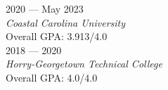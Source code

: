 
	\hfill 2020 --- May 2023 \\
\textit{Coastal Carolina University} \\ 
Overall GPA: 3.913/4.0 \\
   \hfill	2018 --- 2020 \\ 
\textit{Horry-Georgetown Technical College} \\ 
Overall GPA: 4.0/4.0 \\
